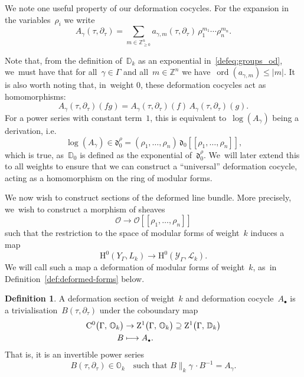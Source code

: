 \documentclass[JEP,XML,SOM,Unicode,published]{cedram}
\newcommand\mto{\mathchoice{\longmapsto}{\mapsto}{\mapsto}{\mapsto}}
\let\oldbullet\bullet
\renewcommand{\bullet}{{\scriptscriptstyle\oldbullet}}
\theoremstyle{plain}
\theoremstyle{definition}
\newtheorem{definition}[theoremcounter]{Definition}
\newcommand{\tx}{\text}
\newcommand{\bbD}{\ensuremath{\mathbb{D}}}
\newcommand{\bbO}{\ensuremath{\mathbb{O}}}
\newcommand{\bbZ}{\ensuremath{\mathbb{Z}}}
\newcommand{\cL}{\ensuremath{\mathcal{L}}}
\newcommand{\cO}{\ensuremath{\mathcal{O}}}
\newcommand{\cY}{\ensuremath{\mathcal{Y}}}
\newcommand{\frakd}{\ensuremath{\mathfrak{d}}}
\newcommand{\rmC}{\ensuremath{\mathrm{C}}}
\newcommand{\rmH}{\ensuremath{\mathrm{H}}}
\newcommand{\rmZ}{\ensuremath{\mathrm{Z}}}
\newcommand{\llbrkt}{[\![}
\newcommand{\rrbrkt}{]\!]}
\let\Ga\Gamma
\let\ga\gamma
\newcommand{\ord}{\operatorname{ord}}
\begin{document}
We note one useful property of our deformation cocycles. For the expansion in the variables~$\rho_i$ we write
\begin{equation}
\label{eq:deformation_cocyle_coefficients}
A_\ga(\tau, \partial_\tau)
=
\sum_{m \in \bbZ_{\geq 0}^n}
a_{\ga,m}(\tau, \partial_\tau)\,
\rho_1^{m_1} \cdots \rho_n^{m_n}
\tx{.}
\end{equation}

Note that, from the definition of~$\bbD_k$ as an exponential in~\eqref{defeq:groups_od}, we~must have that for all~$\ga \in \Ga$ and all~$m \in \bbZ^n$ we have~$\ord(a_{\ga,m}) \le |m|$. It is also worth noting that, in~weight 0, these deformation cocycles act as homomorphisms:
\begin{equation*}
A_\ga(\tau,\partial_\tau)(fg) = A_\ga(\tau,\partial_\tau)(f)\, A_\ga(\tau,\partial_\tau)(g)
\tx{.}
\end{equation*}
For a power series with constant term~$1$, this is equivalent to~$\log(A_\ga)$ being a derivation, i.e.
\begin{equation*}
\log(A_\ga) \in \frakd_0^\rho
=
(\rho_1,\ldots,\rho_n)\,
\frakd_0\llbrkt \rho_1,\ldots,\rho_n\rrbrkt
\tx{,}
\end{equation*}
which is true, as~$\bbD_0$ is defined as the exponential of~$\frakd_0^\rho$. We~will later extend this to all weights to ensure that we can construct a ``universal'' deformation cocycle, acting as a homomorphism on the ring of modular forms.

We now wish to construct sections of the deformed line bundle. More precisely, we~wish to construct a morphism of sheaves
\begin{equation*}\cO\to \cO \llbrkt \rho_1,\ldots,\rho_n\rrbrkt\end{equation*}
such that the restriction to the space of modular forms of weight~$k$ induces a map
\begin{equation*}\rmH^0(Y_\Ga,L_k) \to \rmH^0(\cY_\Ga,\cL_k).\end{equation*}
We will call such a map a deformation of modular forms of weight~$k$, as~in Definition~\ref{def:deformed-forms} below.

\begin{definition}
\label{def:algebraic_deformation_section}
A deformation section of weight~$k$ and deformation cocycle~$A_\bullet$ is
a trivialisation~$B(\tau, \partial_\tau)$ under the coboundary map
\begin{align*}
\rmC^0\bigl(\Ga,\, \bbO_k \bigr)
&
\to{}
\rmZ^1\bigl(\Ga,\, \bbO_k \bigr)
\supseteq
\rmZ^1\bigl(\Ga,\, \bbD_k \bigr)
\\
B
&\mto
A_\bullet
\tx{.}
\end{align*}
That is, it is an invertible power series
\begin{equation*}
B(\tau,\partial_\tau) \in \bbO_k
\quad\tx{such that\ }
B\big\|_k\gamma\,\cdot B^{-1}
=
A_\ga
\tx{.}
\end{equation*}
\end{definition}
\end{document}
